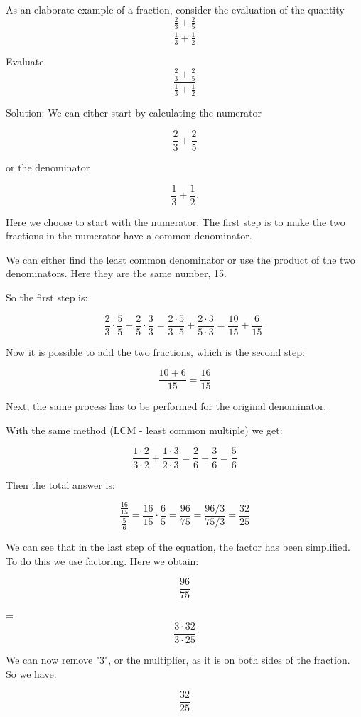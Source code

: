 \documentclass[12pt,a4paper]{article}
\theoremstyle{regla}
\theoremstyle{remark}
\theoremstyle{definition}
\theoremstyle{nonumberbreak}
\begin{document}
\begin{xmpl} As an elaborate example of a fraction, consider the evaluation of the quantity 
$$
\frac{\frac{2}{3}+\frac{2}{5}}{\frac{1}{3}+\frac{1}{2}}
$$
\end{xmpl}
\begin{xmpl}
Evaluate 
$$
\frac{\frac{2}{3}+\frac{2}{5}}{\frac{1}{3}+\frac{1}{2}}
$$

Solution:
We can either start by calculating the numerator

$$\frac{2}{3}+\frac{2}{5}$$

or the denominator

$$\frac{1}{3}+\frac{1}{2}.$$

Here we choose to start with the numerator. 
The first step is to make the two fractions in the numerator have a common denominator. 

We can either find the least common denominator or use the product of the two denominators. Here they are the same number, 15. 

So the first step is:

$$\frac{2}{3}\cdot \frac{5}{5}+\frac{2}{5}\cdot \frac{3}{3} = \frac{2\cdot 5}{3\cdot 5}+\frac{2\cdot 3}{5\cdot 3} = \frac{10}{15}+\frac{6}{15}.$$

Now it is possible to add the two fractions, which is the second step:

$$\frac{10+6}{15} = \frac{16}{15}$$


Next, the same process has to be performed for the original denominator. 

With the same method  (LCM - least common multiple) we get:

$$\frac{1\cdot 2}{3\cdot 2}+\frac{1\cdot 3}{2\cdot 3} = \frac{2}{6}+\frac{3}{6} =\frac{5}{6} $$


Then the total answer is:

$$\frac{\frac{16}{15}}{\frac{5}{6}} {=} \frac{16}{15} \cdot \frac{6}{5} = \frac{96}{75}= \frac{96/3}{75/3}=\frac{32}{25}$$

We can see that in the last step of the equation, the factor has been simplified. To do this we use factoring. 
Here we obtain: 

$$\frac{96}{75}$$

= $$\frac{3\cdot 32}{3\cdot 25}$$



We can now remove "3", or the multiplier, as it is on both sides of the fraction. So we have: 


$$\frac{32}{25}$$


\end{xmpl}
\end{document}
